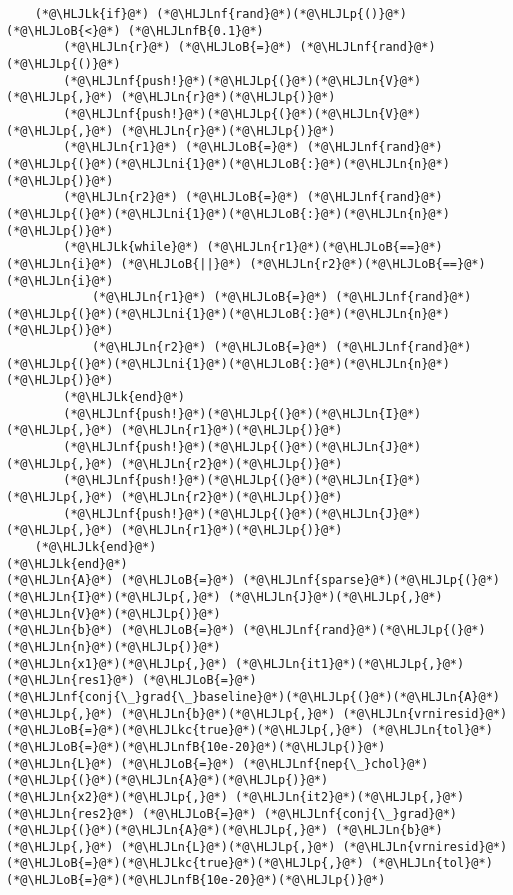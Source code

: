 \documentclass[12pt,a4paper]{article}
\newcommand{\HLJLk}[1]{\textcolor[RGB]{148,91,176}{\textbf{#1}}}
\newcommand{\HLJLkc}[1]{\textcolor[RGB]{59,151,46}{\textit{#1}}}
\newcommand{\HLJLn}[1]{#1}
\newcommand{\HLJLnf}[1]{\textcolor[RGB]{66,102,213}{#1}}
\newcommand{\HLJLnfB}[1]{\textcolor[RGB]{59,151,46}{#1}}
\newcommand{\HLJLni}[1]{\textcolor[RGB]{59,151,46}{#1}}
\newcommand{\HLJLoB}[1]{\textcolor[RGB]{102,102,102}{\textbf{#1}}}
\newcommand{\HLJLp}[1]{#1}
\begin{document}
\begin{lstlisting}
    (*@\HLJLk{if}@*) (*@\HLJLnf{rand}@*)(*@\HLJLp{()}@*) (*@\HLJLoB{<}@*) (*@\HLJLnfB{0.1}@*)
        (*@\HLJLn{r}@*) (*@\HLJLoB{=}@*) (*@\HLJLnf{rand}@*)(*@\HLJLp{()}@*)
        (*@\HLJLnf{push!}@*)(*@\HLJLp{(}@*)(*@\HLJLn{V}@*)(*@\HLJLp{,}@*) (*@\HLJLn{r}@*)(*@\HLJLp{)}@*)
        (*@\HLJLnf{push!}@*)(*@\HLJLp{(}@*)(*@\HLJLn{V}@*)(*@\HLJLp{,}@*) (*@\HLJLn{r}@*)(*@\HLJLp{)}@*)
        (*@\HLJLn{r1}@*) (*@\HLJLoB{=}@*) (*@\HLJLnf{rand}@*)(*@\HLJLp{(}@*)(*@\HLJLni{1}@*)(*@\HLJLoB{:}@*)(*@\HLJLn{n}@*)(*@\HLJLp{)}@*)
        (*@\HLJLn{r2}@*) (*@\HLJLoB{=}@*) (*@\HLJLnf{rand}@*)(*@\HLJLp{(}@*)(*@\HLJLni{1}@*)(*@\HLJLoB{:}@*)(*@\HLJLn{n}@*)(*@\HLJLp{)}@*)
        (*@\HLJLk{while}@*) (*@\HLJLn{r1}@*)(*@\HLJLoB{==}@*)(*@\HLJLn{i}@*) (*@\HLJLoB{||}@*) (*@\HLJLn{r2}@*)(*@\HLJLoB{==}@*)(*@\HLJLn{i}@*) 
            (*@\HLJLn{r1}@*) (*@\HLJLoB{=}@*) (*@\HLJLnf{rand}@*)(*@\HLJLp{(}@*)(*@\HLJLni{1}@*)(*@\HLJLoB{:}@*)(*@\HLJLn{n}@*)(*@\HLJLp{)}@*)
            (*@\HLJLn{r2}@*) (*@\HLJLoB{=}@*) (*@\HLJLnf{rand}@*)(*@\HLJLp{(}@*)(*@\HLJLni{1}@*)(*@\HLJLoB{:}@*)(*@\HLJLn{n}@*)(*@\HLJLp{)}@*)
        (*@\HLJLk{end}@*)
        (*@\HLJLnf{push!}@*)(*@\HLJLp{(}@*)(*@\HLJLn{I}@*)(*@\HLJLp{,}@*) (*@\HLJLn{r1}@*)(*@\HLJLp{)}@*)
        (*@\HLJLnf{push!}@*)(*@\HLJLp{(}@*)(*@\HLJLn{J}@*)(*@\HLJLp{,}@*) (*@\HLJLn{r2}@*)(*@\HLJLp{)}@*)
        (*@\HLJLnf{push!}@*)(*@\HLJLp{(}@*)(*@\HLJLn{I}@*)(*@\HLJLp{,}@*) (*@\HLJLn{r2}@*)(*@\HLJLp{)}@*)
        (*@\HLJLnf{push!}@*)(*@\HLJLp{(}@*)(*@\HLJLn{J}@*)(*@\HLJLp{,}@*) (*@\HLJLn{r1}@*)(*@\HLJLp{)}@*)
    (*@\HLJLk{end}@*)
(*@\HLJLk{end}@*)
(*@\HLJLn{A}@*) (*@\HLJLoB{=}@*) (*@\HLJLnf{sparse}@*)(*@\HLJLp{(}@*)(*@\HLJLn{I}@*)(*@\HLJLp{,}@*) (*@\HLJLn{J}@*)(*@\HLJLp{,}@*) (*@\HLJLn{V}@*)(*@\HLJLp{)}@*)
(*@\HLJLn{b}@*) (*@\HLJLoB{=}@*) (*@\HLJLnf{rand}@*)(*@\HLJLp{(}@*)(*@\HLJLn{n}@*)(*@\HLJLp{)}@*)
(*@\HLJLn{x1}@*)(*@\HLJLp{,}@*) (*@\HLJLn{it1}@*)(*@\HLJLp{,}@*) (*@\HLJLn{res1}@*) (*@\HLJLoB{=}@*) (*@\HLJLnf{conj{\_}grad{\_}baseline}@*)(*@\HLJLp{(}@*)(*@\HLJLn{A}@*)(*@\HLJLp{,}@*) (*@\HLJLn{b}@*)(*@\HLJLp{,}@*) (*@\HLJLn{vrniresid}@*)(*@\HLJLoB{=}@*)(*@\HLJLkc{true}@*)(*@\HLJLp{,}@*) (*@\HLJLn{tol}@*)(*@\HLJLoB{=}@*)(*@\HLJLnfB{10e-20}@*)(*@\HLJLp{)}@*)
(*@\HLJLn{L}@*) (*@\HLJLoB{=}@*) (*@\HLJLnf{nep{\_}chol}@*)(*@\HLJLp{(}@*)(*@\HLJLn{A}@*)(*@\HLJLp{)}@*)
(*@\HLJLn{x2}@*)(*@\HLJLp{,}@*) (*@\HLJLn{it2}@*)(*@\HLJLp{,}@*) (*@\HLJLn{res2}@*) (*@\HLJLoB{=}@*) (*@\HLJLnf{conj{\_}grad}@*)(*@\HLJLp{(}@*)(*@\HLJLn{A}@*)(*@\HLJLp{,}@*) (*@\HLJLn{b}@*)(*@\HLJLp{,}@*) (*@\HLJLn{L}@*)(*@\HLJLp{,}@*) (*@\HLJLn{vrniresid}@*)(*@\HLJLoB{=}@*)(*@\HLJLkc{true}@*)(*@\HLJLp{,}@*) (*@\HLJLn{tol}@*)(*@\HLJLoB{=}@*)(*@\HLJLnfB{10e-20}@*)(*@\HLJLp{)}@*)


\end{lstlisting}
\end{document}
